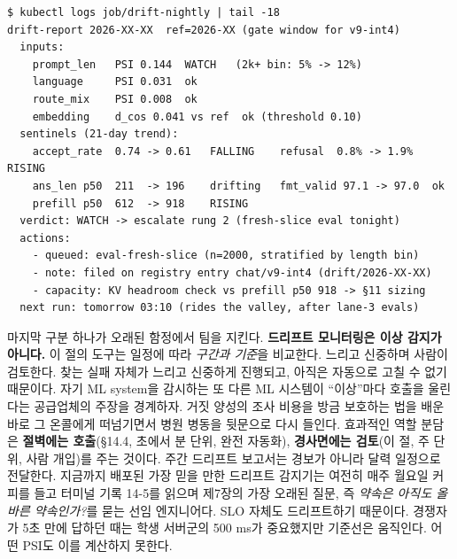 \begin{terminalbox}
\begin{Verbatim}[breaklines=true,breakanywhere=true,fontsize=\small,formatcom=\color{tbbtermfg},codes=\tbbcodeactive]
$ kubectl logs job/drift-nightly | tail -18
drift-report 2026-XX-XX  ref=2026-XX (gate window for v9-int4)
  inputs:
    prompt_len   PSI 0.144  WATCH   (2k+ bin: 5% -> 12%)
    language     PSI 0.031  ok
    route_mix    PSI 0.008  ok
    embedding    d_cos 0.041 vs ref  ok (threshold 0.10)
  sentinels (21-day trend):
    accept_rate  0.74 -> 0.61   FALLING    refusal  0.8% -> 1.9%  RISING
    ans_len p50  211  -> 196    drifting   fmt_valid 97.1 -> 97.0  ok
    prefill p50  612  -> 918    RISING
  verdict: WATCH -> escalate rung 2 (fresh-slice eval tonight)
  actions:
    - queued: eval-fresh-slice (n=2000, stratified by length bin)
    - note: filed on registry entry chat/v9-int4 (drift/2026-XX-XX)
    - capacity: KV headroom check vs prefill p50 918 -> §11 sizing
  next run: tomorrow 03:10 (rides the valley, after lane-3 evals)
\end{Verbatim}
\end{terminalbox}

마지막 구분 하나가 오래된 함정에서 팀을 지킨다. \textbf{드리프트 모니터링은 이상 감지가 아니다.} 이 절의 도구는 일정에 따라 \textit{구간과 기준}을 비교한다. 느리고 신중하며 사람이 검토한다. 찾는 실패 자체가 느리고 신중하게 진행되고, 아직은 자동으로 고칠 수 없기 때문이다. 자기 ML system을 감시하는 또 다른 ML 시스템이 “이상”마다 호출을 울린다는 공급업체의 주장을 경계하자. 거짓 양성의 조사 비용을 방금 보호하는 법을 배운 바로 그 온콜에게 떠넘기면서 병원 병동을 뒷문으로 다시 들인다. 효과적인 역할 분담은 \textbf{절벽에는 호출}(§14.4, 초에서 분 단위, 완전 자동화), \textbf{경사면에는 검토}(이 절, 주 단위, 사람 개입)를 주는 것이다. 주간 드리프트 보고서는 경보가 아니라 달력 일정으로 전달한다. 지금까지 배포된 가장 믿을 만한 드리프트 감지기는 여전히 매주 월요일 커피를 들고 터미널 기록 14-5를 읽으며 제7장의 가장 오래된 질문, 즉 \textit{약속은 아직도 올바른 약속인가?}를 묻는 선임 엔지니어다. SLO 자체도 드리프트하기 때문이다. 경쟁자가 5초 만에 답하던 때는 학생 서버군의 500 ms가 중요했지만 기준선은 움직인다. 어떤 PSI도 이를 계산하지 못한다.


